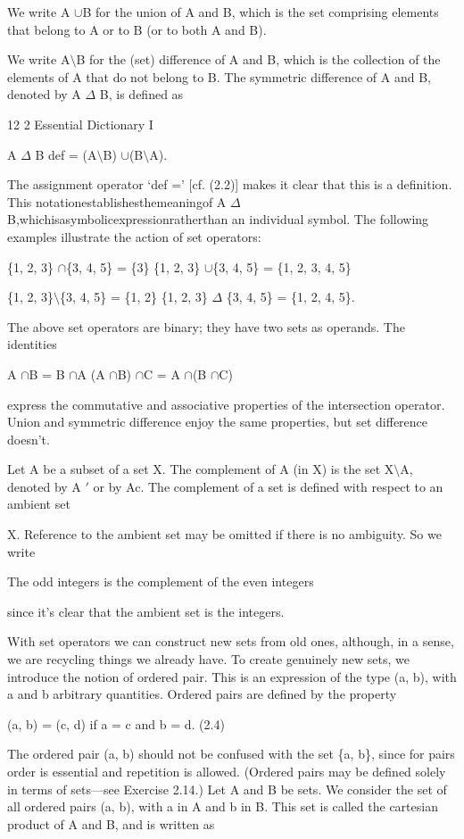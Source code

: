 \documentclass[11pt]{article}
\theoremstyle{plain}
\theoremstyle{definition}
\begin{document}
We write A $\cup$B for the union of A and B, which is the set comprising elements that belong to A or to B (or to both A and B).

We write A$\setminus$B for the (set) difference of A and B, which is the collection of the elements of A that do not belong to B. The symmetric difference of A and B, denoted by A $\Delta$ B, is defined as

12 2 Essential Dictionary I

A $\Delta$ B def = (A$\setminus$B) $\cup$(B$\setminus$A).

The assignment operator `def =' [cf. (2.2)] makes it clear that this is a definition. This notationestablishesthemeaningof A $\Delta$ B,whichisasymbolicexpressionratherthan an individual symbol. The following examples illustrate the action of set operators:

\{1, 2, 3\} $\cap$\{3, 4, 5\} = \{3\} \{1, 2, 3\} $\cup$\{3, 4, 5\} = \{1, 2, 3, 4, 5\}

\{1, 2, 3\}$\setminus$\{3, 4, 5\} = \{1, 2\} \{1, 2, 3\} $\Delta$ \{3, 4, 5\} = \{1, 2, 4, 5\}.

The above set operators are binary; they have two sets as operands. The identities

A $\cap$B = B $\cap$A (A $\cap$B) $\cap$C = A $\cap$(B $\cap$C)

express the commutative and associative properties of the intersection operator. Union and symmetric difference enjoy the same properties, but set difference doesn't.

Let A be a subset of a set X. The complement of A (in X) is the set X$\setminus$A, denoted by A $'$ or by Ac. The complement of a set is defined with respect to an ambient set

X. Reference to the ambient set may be omitted if there is no ambiguity. So we write

The odd integers is the complement of the even integers

since it's clear that the ambient set is the integers.

With set operators we can construct new sets from old ones, although, in a sense, we are recycling things we already have. To create genuinely new sets, we introduce the notion of ordered pair. This is an expression of the type (a, b), with a and b arbitrary quantities. Ordered pairs are defined by the property

(a, b) = (c, d) if a = c and b = d. (2.4)

The ordered pair (a, b) should not be confused with the set \{a, b\}, since for pairs order is essential and repetition is allowed. (Ordered pairs may be defined solely in terms of sets---see Exercise 2.14.) Let A and B be sets. We consider the set of all ordered pairs (a, b), with a in A and b in B. This set is called the cartesian product of A and B, and is written as
\end{document}
